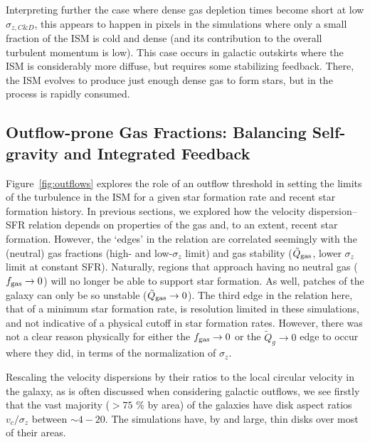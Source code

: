 \documentclass[usletter,fleqn,usenatbib]{mnras}
\begin{document}
Interpreting further the case where dense gas depletion times become short at low $\sigma_{z,C\&D}$, this appears to happen in pixels in the simulations where only a small fraction of the ISM is cold and dense (and its contribution to the overall turbulent momentum is low).  This case occurs in galactic outskirts where the ISM is considerably more diffuse, but requires some stabilizing feedback.  There, the ISM evolves to produce just enough dense gas to form stars, but in the process is rapidly consumed.  

\subsection{Outflow-prone Gas Fractions: Balancing Self-gravity and Integrated Feedback}\label{subsec:outflows}
Figure~\ref{fig:outflows} explores the role of an outflow threshold in setting the limits of the turbulence in the ISM for a given star formation rate and recent star formation history.   In previous sections, we explored how the velocity dispersion--SFR relation depends on properties of the gas and, to an extent, recent star formation.  However, the `edges' in the relation are correlated seemingly with the (neutral) gas fractions (high- and low-$\sigma_z$ limit) and gas stability ($\tilde Q_{\rm gas}$, lower $\sigma_z$ limit at constant SFR).  Naturally, regions that approach having no neutral gas ($f_{\rm gas} \rightarrow 0$) will no longer be able to support star formation.  As well, patches of the galaxy can only be so unstable ($\tilde Q_{\rm gas} \rightarrow 0$).  The third edge in the relation here, that of a minimum star formation rate, is resolution limited in these simulations, and not indicative of a physical cutoff in star formation rates.  However, there was not a clear reason physically for either the $f_{\rm gas} \rightarrow 0$ or the $\tilde Q_g \rightarrow 0$ edge to occur where they did, in terms of the normalization of $\sigma_z$.  

Rescaling the velocity dispersions by their ratios to the local circular velocity in the galaxy, as is often discussed when considering galactic outflows, we see firstly that the vast majority ($> 75$ \% by area) of the galaxies have disk aspect ratios $v_c/\sigma_z$ between $\sim 4-20$.  The simulations have, by and large, thin disks over most of their areas. 
\end{document}
